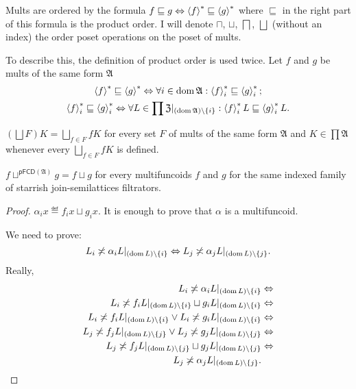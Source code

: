 Mults are ordered by the formula $f\sqsubseteq g\Leftrightarrow\left\langle f\right\rangle ^{\ast}\sqsubseteq\left\langle g\right\rangle ^{\ast}$
where $\sqsubseteq$ in the right part of this formula is the product
order. I will denote $\sqcap$, $\sqcup$, $\bigsqcap$, $\bigsqcup$
(without an index) the order poset operations on the poset of mults.
\begin{rem}
To describe this, the definition of product order is used twice. Let
$f$ and $g$ be mults of the same form $\mathfrak{A}$
\begin{gather*}
\left\langle f\right\rangle ^{\ast}\sqsubseteq\left\langle g\right\rangle ^{\ast}\Leftrightarrow\forall i\in\operatorname{dom}\mathfrak{A}:\left\langle f\right\rangle ^{\ast}_{i}\sqsubseteq\left\langle g\right\rangle ^{\ast}_{i};\\
\left\langle f\right\rangle ^{\ast}_{i}\sqsubseteq\left\langle g\right\rangle ^{\ast}_{i}\Leftrightarrow\forall L\in\prod\mathfrak{Z}|_{(\operatorname{dom}\mathfrak{A})\setminus\{i\}}:\left\langle f\right\rangle ^{\ast}_{i}L\sqsubseteq\left\langle g\right\rangle ^{\ast}_{i}L.
\end{gather*}
\end{rem}
\begin{obvious}
$\left(\bigsqcup F\right)K=\bigsqcup_{f\in F}fK$ for every set $F$
of mults of the same form $\mathfrak{A}$ and $K\in\prod\mathfrak{A}$
whenever every $\bigsqcup_{f\in F}fK$ is defined.\end{obvious}
\begin{thm}
$f\sqcup^{\mathsf{pFCD}(\mathfrak{A})}g=f\sqcup g$ for every multifuncoids
$f$ and $g$ for the same indexed family of starrish join-semilattices
filtrators.\end{thm}
\begin{proof}
$\alpha_{i}x\eqdef f_{i}x\sqcup g_{i}x$. It is enough to prove that
$\alpha$ is a multifuncoid.

We need to prove: 
\[
L_{i}\not\asymp\alpha_{i}L|_{(\operatorname{dom} L)\setminus\{i\}}\Leftrightarrow L_{j}\not\asymp\alpha_{j}L|_{(\operatorname{dom} L)\setminus\{j\}}.
\]
Really,
\begin{align*}
L_{i}\not\asymp\alpha_{i}L|_{(\operatorname{dom} L)\setminus\{i\}} & \Leftrightarrow\\
L_{i}\not\asymp f_{i}L|_{(\operatorname{dom} L)\setminus\{i\}}\sqcup g_{i}L|_{(\operatorname{dom} L)\setminus\{i\}} & \Leftrightarrow\\
L_{i}\not\asymp f_{i}L|_{(\operatorname{dom} L)\setminus\{i\}}\lor L_{i}\not\asymp g_{i}L|_{(\operatorname{dom} L)\setminus\{i\}} & \Leftrightarrow\\
L_{j}\not\asymp f_{j}L|_{(\operatorname{dom} L)\setminus\{j\}}\lor L_{j}\not\asymp g_{j}L|_{(\operatorname{dom} L)\setminus\{j\}} & \Leftrightarrow\\
L_{j}\not\asymp f_{j}L|_{(\operatorname{dom} L)\setminus\{j\}}\sqcup g_{j}L|_{(\operatorname{dom} L)\setminus\{j\}} & \Leftrightarrow\\
L_{j}\not\asymp\alpha_{j}L|_{(\operatorname{dom} L)\setminus\{j\}}.
\end{align*}
\end{proof}
